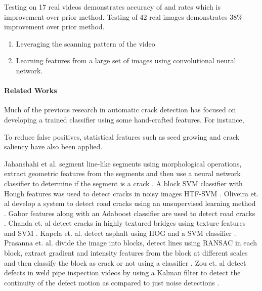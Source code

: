 
     
     Testing on 17 real videos demonstrates accuracy of  and  rates which is \comment{[XX]\%} improvement over prior method. Testing of 42 real images demonstrates 38\% improvement over prior method. %
    
    \begin{enumerate}
    \item Leveraging the scanning pattern of the video
    \item Learning features from a large set of images using convolutional neural network.
    \end{enumerate}
    
    
    
    \paragraph{Related Works}
        Much of the previous research in automatic crack detection has focused on developing a trained classifier using some hand-crafted features. For instance, 
        
        
        
        To reduce false positives, statistical features such as seed growing \cite{Li2011} and crack saliency \cite{Xu2013} have also been applied. 
        
        
        Jahanshahi et al. segment line-like segments using morphological operations, extract geometric features from the segments and then use a neural network classifier to determine if the segment is a crack \cite{jahanshahi2013}. A block SVM classifier with Hough features was used to detect cracks in noisy images HTF-SVM \cite{Hu2010}. Oliveira et. al develop a system to detect road cracks using an unsupervised learning method \cite{Oliveira2014}. Gabor features along with an Adaboost classifier are used to detect road cracks \cite{Medina2014}. Chanda et. al  detect cracks in highly textured bridges using texture features and SVM \cite{chanda2014}. Kapela et. al. detect asphalt using HOG and a SVM classifier \cite{Kapela2015}. Prasanna et. al. divide the image into blocks, detect lines using RANSAC in each block, extract gradient and intensity features from the block at different scales and then classify the block as crack or not using a classifier \cite{Prasanna2014}. Zou et. al detect defects in weld pipe inspection videos by using a Kalman filter to detect the continuity of the defect motion as compared to just noise detections \cite{Zou2015}. 
    